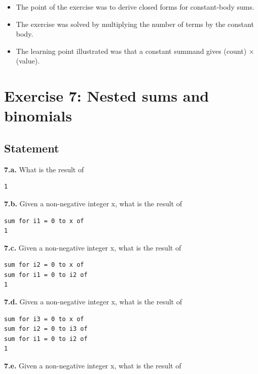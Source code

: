 \documentclass[12pt]{article}
\begin{document}
\begin{itemize}

\item
  The point of the exercise was to derive closed forms for constant-body sums.

\item
  The exercise was solved by multiplying the number of terms by the constant body.

\item
  The learning point illustrated was that a constant summand gives (count) $\times$ (value).

\end{itemize}


\newpage

\section{Exercise 7: Nested sums and binomials}


\subsection{Statement}

\textbf{7.a.} What is the result of

\begin{verbatim}
1
\end{verbatim}

\textbf{7.b.} Given a non-negative integer x, what is the result of

\begin{verbatim}
sum for i1 = 0 to x of
1
\end{verbatim}

\textbf{7.c.} Given a non-negative integer x, what is the result of

\begin{verbatim}
sum for i2 = 0 to x of
sum for i1 = 0 to i2 of
1
\end{verbatim}

\textbf{7.d.} Given a non-negative integer x, what is the result of

\begin{verbatim}
sum for i3 = 0 to x of
sum for i2 = 0 to i3 of
sum for i1 = 0 to i2 of
1
\end{verbatim}

\textbf{7.e.} Given a non-negative integer x, what is the result of
\end{document}

